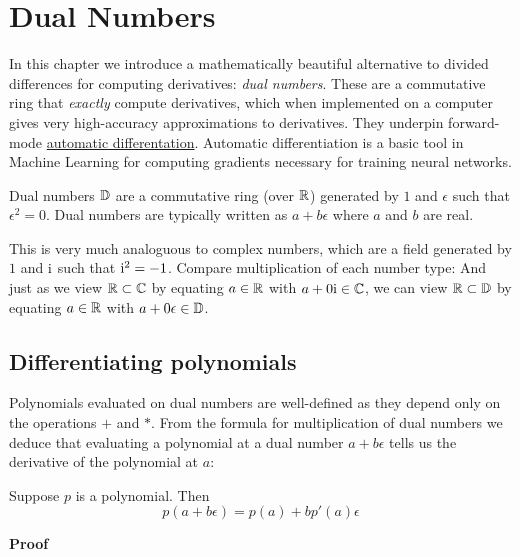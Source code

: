 
\section{Dual Numbers}
In this chapter we introduce a mathematically beautiful  alternative to divided differences for computing derivatives: \emph{dual numbers}. These are a commutative ring that \emph{exactly} compute derivatives, which when implemented on a computer gives very high-accuracy approximations to derivatives. They underpin forward-mode \href{https://en.wikipedia.org/wiki/Automatic_differentiation}{automatic differentation}. Automatic differentiation  is a basic tool in Machine Learning for computing gradients necessary for training neural networks.

\begin{definition} Dual numbers ${\mathbb D}$ are a commutative ring (over ${\mathbb R}$) generated by $1$ and $\ensuremath{\epsilon}$ such that $\ensuremath{\epsilon}^2 = 0$. Dual numbers are typically written as $a + b \ensuremath{\epsilon}$ where $a$ and $b$ are real. \end{definition}

This is very much analoguous to complex numbers, which are a field generated by $1$ and ${\rm i}$ such that ${\rm i}^2 = -1$. Compare multiplication of each number type:
And just as we view ${\mathbb R} \subset {\mathbb C}$ by equating $a \in {\mathbb R}$ with $a + 0{\rm i} \in {\mathbb C}$, we can view ${\mathbb R} \subset {\mathbb D}$ by equating $a \in {\mathbb R}$ with $a + 0{\rm \epsilon} \in {\mathbb D}$.

\subsection{Differentiating polynomials}
Polynomials evaluated on dual numbers are well-defined as they depend only on the operations $+$ and $*$. From the formula for multiplication of dual numbers we deduce that evaluating a polynomial at a dual number $a + b \ensuremath{\epsilon}$ tells us the derivative of the polynomial at $a$:

\begin{theorem} Suppose $p$ is a polynomial. Then
\[
p(a + b \ensuremath{\epsilon}) = p(a) + b p'(a) \ensuremath{\epsilon}
\]
\end{theorem}
\textbf{Proof}

